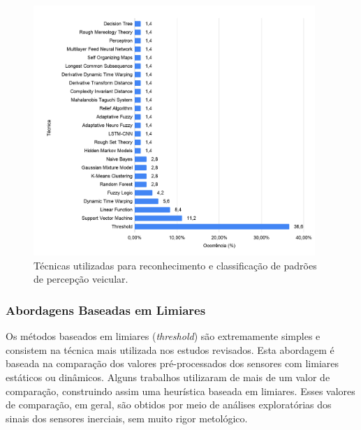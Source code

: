 \begin{figure}[h!]
  \centering
  \caption{Técnicas utilizadas para reconhecimento e classificação de padrões de percepção veicular.}
   \label{fig:tecnicas_ocorrencia}
   \includegraphics[width=0.95\textwidth]{figuras/fig_19.png}
\end{figure}

\subsubsection{Abordagens Baseadas em Limiares} 

Os métodos baseados em limiares (\textit{threshold}) são extremamente simples e consistem na técnica mais utilizada nos estudos revisados. Esta abordagem é baseada na comparação dos valores pré-processados dos sensores com limiares estáticos ou dinâmicos. Alguns trabalhos utilizaram de mais de um valor de comparação, construindo assim uma heurística baseada em limiares. Esses valores de comparação, em geral, são obtidos por meio de análises exploratórias dos sinais dos sensores inerciais, sem muito rigor metológico.

